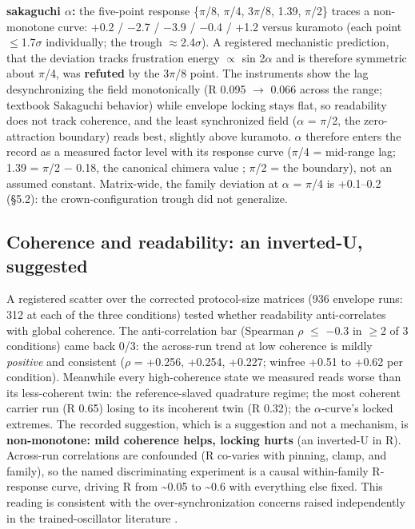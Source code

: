 \documentclass{article}
\begin{document}
\textbf{sakaguchi \ensuremath{\alpha}:} the five-point response
\{\ensuremath{\pi}/8, \ensuremath{\pi}/4, 3\ensuremath{\pi}/8, 1.39,
\ensuremath{\pi}/2\} traces a non-monotone curve: +0.2 /
\ensuremath{-}2.7 / \ensuremath{-}3.9 / \ensuremath{-}0.4 / +1.2 versus
kuramoto (each point \ensuremath{\leq}1.7\ensuremath{\sigma}
individually; the trough \ensuremath{\approx}2.4\ensuremath{\sigma}). A
registered mechanistic prediction, that the deviation tracks frustration
energy \ensuremath{\propto} sin 2\ensuremath{\alpha} and is therefore
symmetric about \ensuremath{\pi}/4, was \textbf{refuted} by the
3\ensuremath{\pi}/8 point. The instruments show the lag desynchronizing
the field monotonically (R 0.095 \ensuremath{\to} 0.066 across the
range; textbook Sakaguchi behavior) while envelope locking stays flat,
so readability does not track coherence, and the least synchronized
field (\ensuremath{\alpha} = \ensuremath{\pi}/2, the zero-attraction
boundary) reads best, slightly above kuramoto. \ensuremath{\alpha}
therefore enters the record as a measured factor level with its response
curve (\ensuremath{\pi}/4 = mid-range lag; 1.39 = \ensuremath{\pi}/2
\ensuremath{-} 0.18, the canonical chimera value \citep{abrams2004};
\ensuremath{\pi}/2 = the boundary), not an assumed constant.
Matrix-wide, the family deviation at \ensuremath{\alpha} =
\ensuremath{\pi}/4 is +0.1--0.2 (§5.2): the crown-configuration trough
did not generalize.

\subsection{Coherence and readability: an inverted-U,
suggested}\label{coherence-and-readability-an-inverted-u-suggested}

A registered scatter over the corrected protocol-size matrices (936
envelope runs: 312 at each of the three conditions) tested whether
readability anti-correlates with global coherence. The anti-correlation
bar (Spearman \ensuremath{\rho} \ensuremath{\leq} \ensuremath{-}0.3 in
\ensuremath{\geq}2 of 3 conditions) came back 0/3: the across-run trend
at low coherence is mildly \emph{positive} and consistent
(\ensuremath{\rho} = +0.256, +0.254, +0.227; winfree +0.51 to +0.62 per
condition). Meanwhile every high-coherence state we measured reads worse
than its less-coherent twin: the reference-slaved quadrature regime; the
most coherent carrier run (R 0.65) losing to its incoherent twin (R
0.32); the \ensuremath{\alpha}-curve's locked extremes. The recorded
suggestion, which is a suggestion and not a mechanism, is
\textbf{non-monotone: mild coherence helps, locking hurts} (an
inverted-U in R). Across-run correlations are confounded (R co-varies
with pinning, clamp, and family), so the named discriminating experiment
is a causal within-family R-response curve, driving R from
\textasciitilde0.05 to \textasciitilde0.6 with everything else fixed.
This reading is consistent with the over-synchronization concerns raised
independently in the trained-oscillator literature
\citep{unconv-ai2026, nunley2026}.
\end{document}
